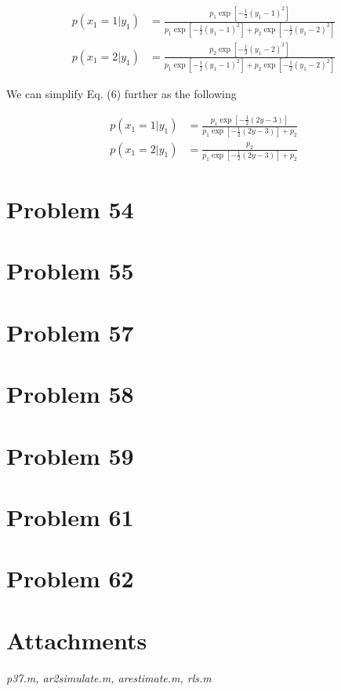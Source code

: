 \documentclass[a4paper, 11pt]{article}
\begin{document}
\begin{equation}
\begin{split}
p(x_1 = 1|y_1) & = \frac{p_1\exp\left[{-\frac{1}{2}(y_1-1)^2}\right]}{p_1\exp\left[{-\frac{1}{2}(y_1-1)^2}\right] + p_2\exp\left[{-\frac{1}{2}(y_1-2)^2}\right]} \\
p(x_1 = 2|y_1) & = \frac{p_2\exp\left[{-\frac{1}{2}(y_1-2)^2}\right]}{p_1\exp\left[{-\frac{1}{2}(y_1-1)^2}\right] + p_2\exp\left[{-\frac{1}{2}(y_1-2)^2}\right]}
\end{split}
\end{equation}

We can simplify Eq. (6) further as the following

\begin{equation}
\begin{split}
p(x_1 = 1|y_1) & = \frac{p_1\exp\left[{-\frac{1}{2}(2y-3)}\right]}{p_1\exp\left[{-\frac{1}{2}(2y-3)}\right] + p_2} \\
p(x_1 = 2|y_1) & = \frac{p_2}{p_1\exp\left[{-\frac{1}{2}(2y-3)}\right] + p_2}
\end{split}
\end{equation}


\section*{Problem 54}






\section*{Problem 55}




\section*{Problem 57}





\section*{Problem 58}





\section*{Problem 59}





\section*{Problem 61}




\section*{Problem 62}




\section*{Attachments}
\textit{p37.m, ar2simulate.m, arestimate.m, rls.m}
\end{document}
